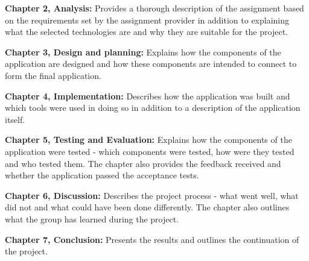 \textbf{Chapter 2, Analysis:}
Provides a thorough description of the assignment based on the requirements set by the assignment provider in addition to explaining what the selected technologies are and why they are suitable for the project.

\textbf{Chapter 3, Design and planning:}
Explains how the components of the application are designed and how these components are intended to connect to form the final application.

\textbf{Chapter 4, Implementation:}
Describes how the application was built and which tools were used in doing so in addition to a description of the application itself.

\textbf{Chapter 5, Testing and Evaluation:}
Explains how the components of the application were tested - which components were tested, how were they tested and who tested them.
The chapter also provides the feedback received and whether the application passed the acceptance tests.

\textbf{Chapter 6, Discussion:}
Describes the project process - what went well, what did not and what could have been done differently.
The chapter also outlines what the group has learned during the project.

\textbf{Chapter 7, Conclusion:}
Presents the results and outlines the continuation of the project.






